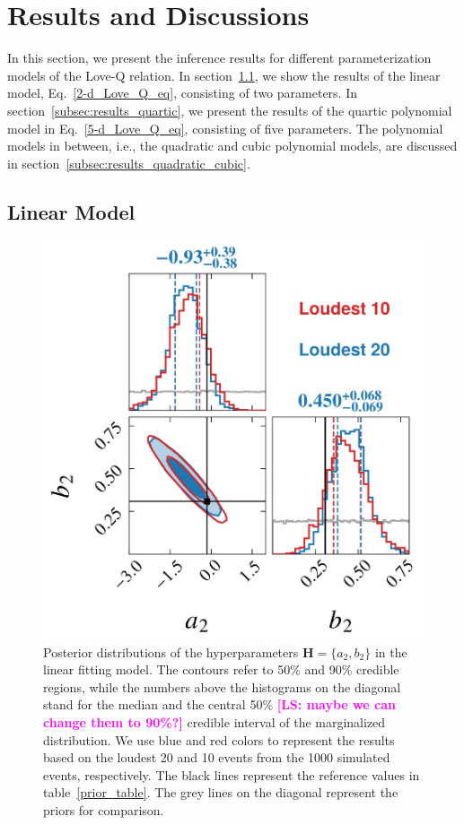 \documentclass[a4paper,11pt]{article}
\newcommand{\LS}[1]{\textcolor{magenta}{\bf #1}}
\begin{document}
\section{Results and Discussions}
\label{sec:results}

In this section, we present the inference results for different parameterization
models of the Love-Q relation. In section~\ref{subsec:results_linear_model}, we 
show the results of the linear model, Eq.~\eqref{2-d_Love_Q_eq}, consisting of
two parameters.  In section~\ref{subsec:results_quartic}, we present the results
of the quartic polynomial model in Eq.~\eqref{5-d_Love_Q_eq}, consisting of five
parameters. The polynomial models in between, i.e., the quadratic and cubic
polynomial models, are discussed in
section~\ref{subsec:results_quadratic_cubic}.

\subsection{Linear Model}
\label{subsec:results_linear_model}

\begin{figure}[t]
    \centering
    \includegraphics[width=0.5\linewidth]{fig_comparison_corner_plot.pdf}
    \caption{Posterior distributions of the hyperparameters ${\bm H} =
    \{a_2,b_2\}$ in the linear fitting model. The contours refer to 50\% and
    90\% credible regions, while the numbers above the histograms on the
    diagonal stand for the median and the central 50\% \LS{[LS: maybe we can
    change them to 90\%?]} credible interval of the marginalized distribution.
    We use blue and red colors to represent the results based on the loudest 20
    and 10 events from the 1000 simulated events, respectively.  The black lines
    represent the reference values in table~\ref{prior_table}.  The grey lines
    on the diagonal represent the priors for comparison.}
    \label{corner2-d}
\end{figure}
\end{document}
